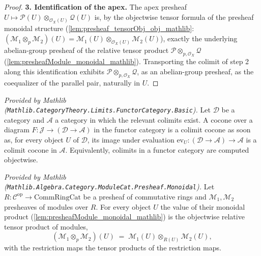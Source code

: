 \begin{proof}
  \textbf{3. Identification of the apex.} The apex presheaf
  \(U \mapsto \mathcal{P}(U) \otimes_{\mathcal{O}_X(U)} \mathcal{Q}(U)\) is, by the
  objectwise tensor formula of the presheaf monoidal structure
  (\cref{lem:presheaf_tensorObj_obj_mathlib}: \((\mathcal{M}_1 \otimes_p
  \mathcal{M}_2)(U) = \mathcal{M}_1(U) \otimes_{\mathcal{O}_X(U)}
  \mathcal{M}_2(U)\)), exactly the underlying abelian-group presheaf of the
  relative tensor product \(\mathcal{P} \otimes_{p,\mathcal{O}_X} \mathcal{Q}\)
  (\cref{lem:presheafModule_monoidal_mathlib}). Transporting the colimit of step 2
  along this identification exhibits
  \(\mathcal{P} \otimes_{p,\mathcal{O}_X} \mathcal{Q}\), as an abelian-group
  presheaf, as the coequalizer of the parallel pair, naturally in \(U\).
\end{proof}

\begin{lemma}
  \label{lem:evaluationJointlyReflectsColimits_mathlib}
  \mathlibok
  \textit{Provided by Mathlib
  (\texttt{Mathlib.CategoryTheory.Limits.FunctorCategory.Basic}).}
  Let \(\mathcal{D}\) be a category and \(\mathcal{A}\) a category in which the
  relevant colimits exist. A cocone over a diagram
  \(F : \mathcal{J} \to (\mathcal{D} \to \mathcal{A})\) in the functor category is
  a colimit cocone as soon as, for every object \(U\) of \(\mathcal{D}\), its image
  under evaluation \(\mathrm{ev}_U : (\mathcal{D} \to \mathcal{A}) \to \mathcal{A}\)
  is a colimit cocone in \(\mathcal{A}\). Equivalently, colimits in a functor
  category are computed objectwise.
\end{lemma}

\begin{lemma}
  \label{lem:presheaf_tensorObj_obj_mathlib}
  \mathlibok
  \textit{Provided by Mathlib
  (\texttt{Mathlib.Algebra.Category.ModuleCat.Presheaf.Monoidal}).}
  Let \(R : \mathcal{C}^{\mathrm{op}} \to \mathrm{CommRingCat}\) be a presheaf of
  commutative rings and \(\mathcal{M}_1, \mathcal{M}_2\) presheaves of modules over
  \(R\). For every object \(U\) the value of their monoidal product
  (\cref{lem:presheafModule_monoidal_mathlib}) is the objectwise relative tensor
  product of modules,
  \[
    (\mathcal{M}_1 \otimes_p \mathcal{M}_2)(U)
      \;=\; \mathcal{M}_1(U) \otimes_{R(U)} \mathcal{M}_2(U),
  \]
  with the restriction maps the tensor products of the restriction maps.
\end{lemma}

